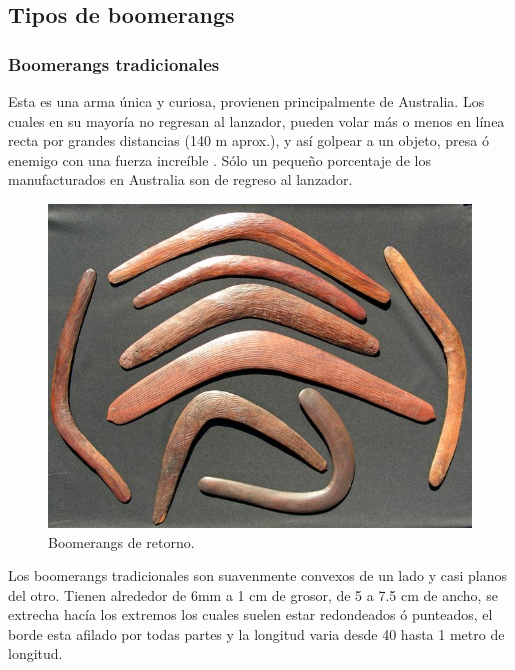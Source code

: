 \subsection{Tipos de boomerangs}

  \subsubsection*{Boomerangs tradicionales}

	Esta es una arma única y curiosa, provienen principalmente de Australia. Los cuales en su mayoría no regresan al lanzador, pueden volar más o menos en línea recta por grandes distancias (140 m aprox.), y así golpear a un objeto, presa ó enemigo con una fuerza increíble . Sólo un pequeño porcentaje de los manufacturados en Australia son de regreso al lanzador.

	\begin{figure}[h]
		\begin{center}
		\includegraphics[scale=1]{imagenes/3-boomerang/boomerang_formas.jpg}
		\caption{Boomerangs de retorno.}
   	    \label{fig1}
		\end{center}
	\end{figure}


	Los boomerangs tradicionales son suavenmente convexos de un lado y casi planos del otro. Tienen alrededor de 6mm a 1 cm de grosor, de 5 a 7.5 cm de ancho, se extrecha hacía los extremos los cuales suelen estar redondeados ó punteados, el borde esta afilado por todas partes y la longitud varia desde 40 hasta 1 metro de longitud.

